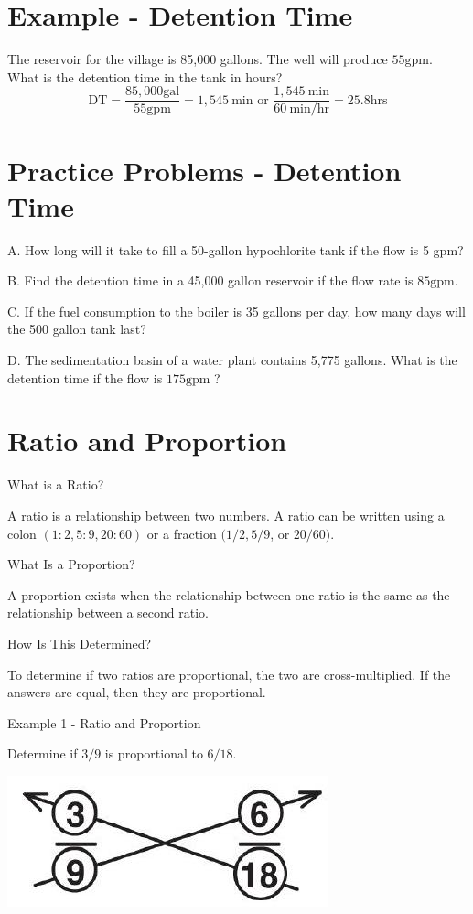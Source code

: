 \documentclass[10pt]{article}
\begin{document}
\section{Example - Detention Time}
The reservoir for the village is 85,000 gallons. The well will produce $55 \mathrm{gpm}$. What is the detention time in the tank in hours?
$$
\mathrm{DT}=\frac{85,000 \mathrm{gal}}{55 \mathrm{gpm}}=1,545 \mathrm{~min} \text { or } \frac{1,545 \mathrm{~min}}{60 \mathrm{~min} / \mathrm{hr}}=25.8 \mathrm{hrs}
$$

\section{Practice Problems - Detention Time}
A. How long will it take to fill a 50-gallon hypochlorite tank if the flow is 5 gpm?

B. Find the detention time in a 45,000 gallon reservoir if the flow rate is $85 \mathrm{gpm}$.

C. If the fuel consumption to the boiler is 35 gallons per day, how many days will the 500 gallon tank last?

D. The sedimentation basin of a water plant contains 5,775 gallons. What is the detention time if the flow is $175 \mathrm{gpm}$ ?

\section{Ratio and Proportion}
What is a Ratio?

A ratio is a relationship between two numbers. A ratio can be written using a colon $(1: 2,5: 9,20: 60)$ or a fraction $(1 / 2,5 / 9$, or $20 / 60)$.

What Is a Proportion?

A proportion exists when the relationship between one ratio is the same as the relationship between a second ratio.

How Is This Determined?

To determine if two ratios are proportional, the two are cross-multiplied. If the answers are equal, then they are proportional.

Example 1 - Ratio and Proportion

Determine if $3 / 9$ is proportional to $6 / 18$.

\includegraphics[max width=\textwidth]{2022_09_11_72dbedc910e6e984560cg-47}
\end{document}
